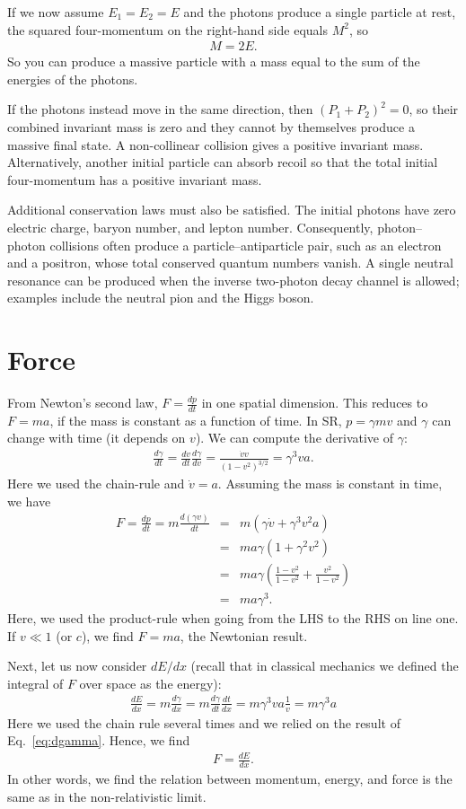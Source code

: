 \documentclass[12pt]{article}
\newcommand{\be}{\begin{eqnarray}}
\newcommand{\ee}{\end{eqnarray}}
\begin{document}
If we now assume $E_1=E_2=E$ and the photons produce a single particle at rest, the squared four-momentum on the right-hand side equals $M^2$, so
\be
M = 2E.
\ee
So you can produce a massive particle with a mass equal to the sum of the energies of the photons.  

If the photons instead move in the same direction, then $(P_1+P_2)^2=0$, so their combined invariant mass is zero and they cannot by themselves produce a massive final state. A non-collinear collision gives a positive invariant mass. Alternatively, another initial particle can absorb recoil so that the total initial four-momentum has a positive invariant mass.

Additional conservation laws must also be satisfied. The initial photons have zero electric charge, baryon number, and lepton number. Consequently, photon--photon collisions often produce a particle--antiparticle pair, such as an electron and a positron, whose total conserved quantum numbers vanish. A single neutral resonance can be produced when the inverse two-photon decay channel is allowed; examples include the neutral pion and the Higgs boson.


\section{Force}\label{sec:force}
From Newton's second law, $F= \frac{dp}{dt}$ in one spatial dimension. This reduces to $F = ma$, if the mass is constant as a function of time. In SR, $p = \gamma m v$ and $\gamma$ can change with time (it depends on $v$). We can compute the derivative of $\gamma$:
\be
\frac{d\gamma}{dt} = \frac{dv}{dt} \frac{d\gamma}{dv} = \frac{\dot{v} v}{(1-v^2)^{3/2}} = \gamma^3 v a.\label{eq:dgamma} 
\ee
Here we used the chain-rule and $\dot{v} = a$. Assuming the mass is constant in time, we have 
\be
F = \frac{dp}{dt} = m\frac{d(\gamma v)}{dt} &=& m(\gamma \dot{v} + \gamma^3 v^2 a) \nonumber \\
&=& m a \gamma (1+ \gamma^2 v^2) \nonumber \\
&=& m a \gamma (\frac{1-v^2}{1-v^2} + \frac{v^2}{1-v^2})\nonumber \\
&=& m a \gamma^3. \label{eq:dpdt}
\ee 
Here, we used the product-rule when going from the LHS to the RHS on line one. If $v\ll1$ (or $c$), we find $F = ma$, the Newtonian result. 

Next, let us now consider $dE/dx$ (recall that in classical mechanics we defined the integral of $F$ over space as the energy):
\be
\frac{dE}{dx} = m \frac{d\gamma}{dx} = m \frac{d\gamma}{dt}\frac{dt}{dx} = m \gamma^3 v a \frac{1}{v} = m \gamma^3 a
\ee
Here we used the chain rule several times and we relied on the result of Eq.~\ref{eq:dgamma}. Hence, we find 
\be 
F = \frac{dE}{dx}.
\ee
In other words, we find the relation between momentum, energy, and force is the same as in the non-relativistic limit. 
\end{document}
